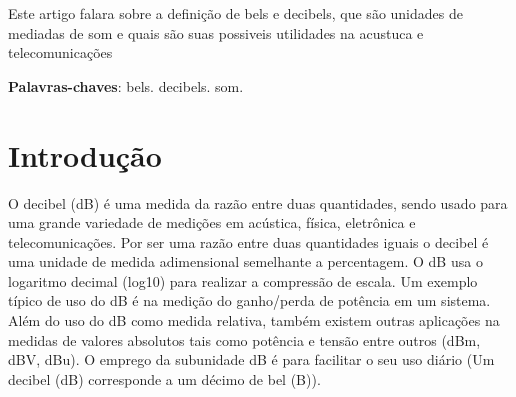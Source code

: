 \documentclass[
	article,			%
	11pt,				%
	oneside,			%
	a4paper,			%
	english,			%
	brazil,				%
	sumario=tradicional
	]{abntex2}
\begin{document}
\frenchspacing 


%
%
\maketitle

\begin{resumoumacoluna}
    Este artigo falara sobre a definição de bels e decibels, que são unidades de mediadas de som e quais são suas possiveis utilidades na acustuca e telecomunicações 
 
 \vspace{\onelineskip}
 
 \noindent
 \textbf{Palavras-chaves}: bels. decibels. som.
\end{resumoumacoluna}


\textual

\section*{Introdução}

        O decibel (dB) é uma medida da razão entre duas quantidades,
    sendo usado para uma grande variedade de medições em acústica,
    física, eletrônica e telecomunicações. Por ser uma razão entre duas
    quantidades iguais o decibel é uma unidade de medida adimensional
    semelhante a percentagem. O dB usa o logaritmo decimal (log10) para
    realizar a compressão de escala. Um exemplo típico de uso do dB é na
    medição do ganho/perda de potência em um sistema. Além do uso do
    dB como medida relativa, também existem outras aplicações na
    medidas de valores absolutos tais como potência e tensão entre outros
    (dBm, dBV, dBu). O emprego da subunidade dB é para facilitar o seu
    uso diário (Um decibel (dB) corresponde a um décimo de bel (B)). 
\end{document}
